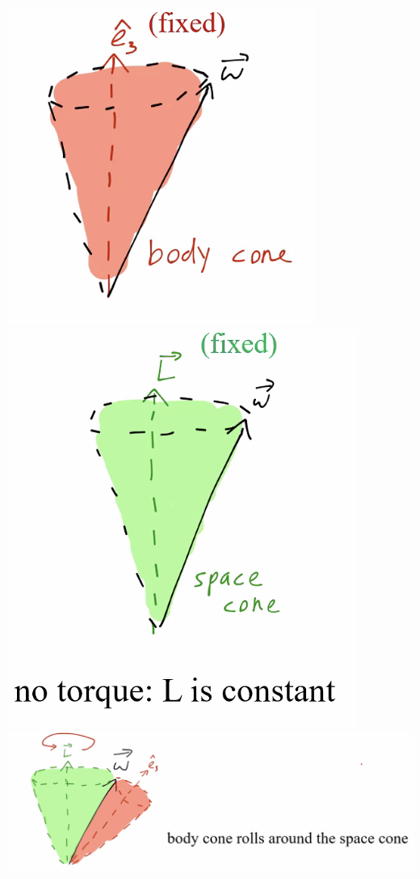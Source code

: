 \begin{center}
    \includegraphics[scale=0.5]{Lecture-20/l20-img4.png}
    \includegraphics[scale=0.5]{Lecture-20/l20-img5.png}
    \includegraphics[scale=0.5]{Lecture-20/l20-img6.png}
\end{center}


